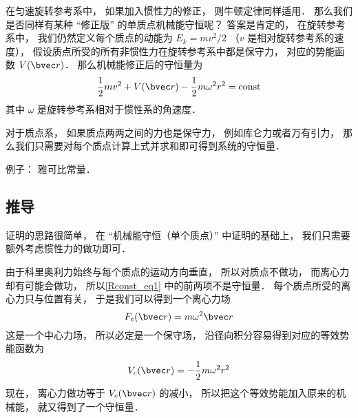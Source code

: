 

在匀速旋转参考系中， 如果加入惯性力的修正， 则牛顿定律同样适用． 那么我们是否同样有某种 “修正版” 的单质点机械能守恒呢？ 答案是肯定的， 在旋转参考系中， 我们仍然定义每个质点的动能为 $E_k = mv^2/2$ （$v$ 是相对旋转参考系的速度）， 假设质点所受的所有非惯性力在旋转参考系中都是保守力， 对应的势能函数 $V(\bvec r)$． 那么机械能修正后的守恒量为
\begin{equation}\label{Rconst_eq1}
\frac{1}{2}m v^2 + V(\bvec r) - \frac{1}{2}m\omega^2 r^2 = \text{const}
\end{equation}
其中 $\omega$ 是旋转参考系相对于惯性系的角速度．

对于质点系， 如果质点两两之间的力也是保守力， 例如库仑力或者万有引力， 那么我们只需要对每个质点计算上式并求和即可得到系统的守恒量．

例子： 雅可比常量．

\subsection{推导}
证明的思路很简单， 在 “机械能守恒（单个质点）” 中证明的基础上， 我们只需要额外考虑惯性力的做功即可．

由于科里奥利力始终与每个质点的运动方向垂直， 所以对质点不做功， 而离心力却有可能会做功， 所以\autoref{Rconst_eq1} 中的前两项不是守恒量． 每个质点所受的离心力只与位置有关， 于是我们可以得到一个离心力场
\begin{equation}
F_c(\bvec r) = m\omega^2 \bvec r
\end{equation}
 这是一个中心力场， 所以必定是一个保守场， 沿径向积分容易得到对应的等效势能函数为
\begin{equation}
V_c(\bvec r) = -\frac{1}{2}m\omega^2 r^2
\end{equation}
现在， 离心力做功等于 $V_c(\bvec r)$ 的减小， 所以把这个等效势能加入原来的机械能， 就又得到了一个守恒量．

